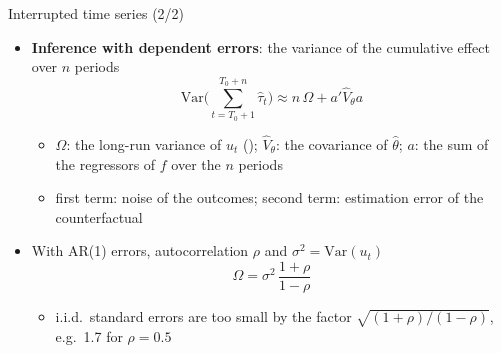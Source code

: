 \begin{frame}{Interrupted time series (2/2)}
\itemsize{\small}
\begin{itemize}
    \item \textbf{Inference with dependent errors}: the variance of the cumulative effect over $n$ periods \[ \mathrm{Var}\Big(\sum_{t=T_0+1}^{T_0+n}\hat\tau_t\Big) \approx n\,\Omega + a'\hat V_\theta a \]
    \begin{itemize}
        \item $\Omega$: the long-run variance of $u_t$ (); $\hat V_\theta$: the covariance of $\hat\theta$; $a$: the sum of the regressors of $f$ over the $n$ periods
        \item first term: noise of the outcomes; second term: estimation error of the counterfactual
    \end{itemize}
    \item With AR(1) errors, autocorrelation $\rho$ and $\sigma^2 = \mathrm{Var}(u_t)$ \[ \Omega = \sigma^2\,\frac{1 + \rho}{1 - \rho} \]
    \begin{itemize}
        \item i.i.d.\ standard errors are too small by the factor $\sqrt{(1 + \rho)/(1 - \rho)}$, e.g.\ 1.7 for $\rho = 0.5$
    \end{itemize}
\end{itemize}
\end{frame}

